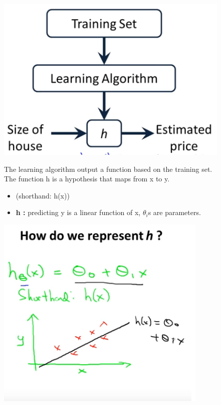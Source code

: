 \documentclass[12pt]{article}
\begin{document}
    \begin{center}
    \includegraphics[scale=0.5]{SupervisedLearning.png}
    \end{center}
    The learning algorithm output a function based on the training set.\\The function h is a hypothesis that maps from x to y.

\begin{itemize}
\item {}    (shorthand: h(x))
\item \textbf{h :} predicting y is a linear function of x, $\theta_i$s are parameters.
\end{itemize}

    \begin{center}
    \includegraphics[scale=0.5]{UnivariateLinearRegression.png}
    \end{center}
\end{document}

